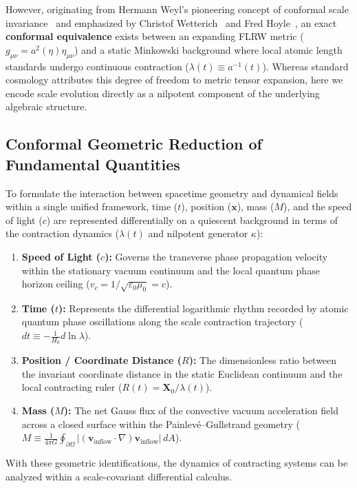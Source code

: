 \documentclass[11pt,a4paper]{article}
\begin{document}
However, originating from Hermann Weyl's pioneering concept of conformal scale invariance~\cite{weyl1918} and emphasized by Christof Wetterich~\cite{wetterich2013} and Fred Hoyle~\cite{hoyle1964}, an exact \textbf{conformal equivalence} exists between an expanding FLRW metric ($g_{\mu\nu} = a^2(\eta) \eta_{\mu\nu}$) and a static Minkowski background where local atomic length standards undergo continuous contraction ($\lambda(t) \equiv a^{-1}(t)$). Whereas standard cosmology attributes this degree of freedom to metric tensor expansion, here we encode scale evolution directly as a nilpotent component of the underlying algebraic structure.

\subsection{Conformal Geometric Reduction of Fundamental Quantities}
\label{sec:geometrik_indirgeme}

To formulate the interaction between spacetime geometry and dynamical fields within a single unified framework, time ($t$), position ($\mathbf{x}$), mass ($M$), and the speed of light ($c$) are represented differentially on a quiescent background in terms of the contraction dynamics ($\lambda(t)$ and nilpotent generator $\kappa$):
\begin{enumerate}
    \item \textbf{Speed of Light ($c$):} Governs the transverse phase propagation velocity within the stationary vacuum continuum and the local quantum phase horizon ceiling ($v_c = 1/\sqrt{\varepsilon_0\mu_0} = c$).
    \item \textbf{Time ($t$):} Represents the differential logarithmic rhythm recorded by atomic quantum phase oscillations along the scale contraction trajectory ($dt \equiv -\frac{1}{H_0} d\ln\lambda$).
    \item \textbf{Position / Coordinate Distance ($R$):} The dimensionless ratio between the invariant coordinate distance in the static Euclidean continuum and the local contracting ruler ($R(t) = \mathbf{X}_0 / \lambda(t)$).
    \item \textbf{Mass ($M$):} The net Gauss flux of the convective vacuum acceleration field across a closed surface within the Painlevé--Gullstrand geometry ($M \equiv \frac{1}{4\pi G} \oint_{\partial \Omega} |(\mathbf{v}_{\mathrm{inflow}} \cdot \nabla) \mathbf{v}_{\mathrm{inflow}}| \, dA$).
\end{enumerate}
With these geometric identifications, the dynamics of contracting systems can be analyzed within a scale-covariant differential calculus.
\end{document}

